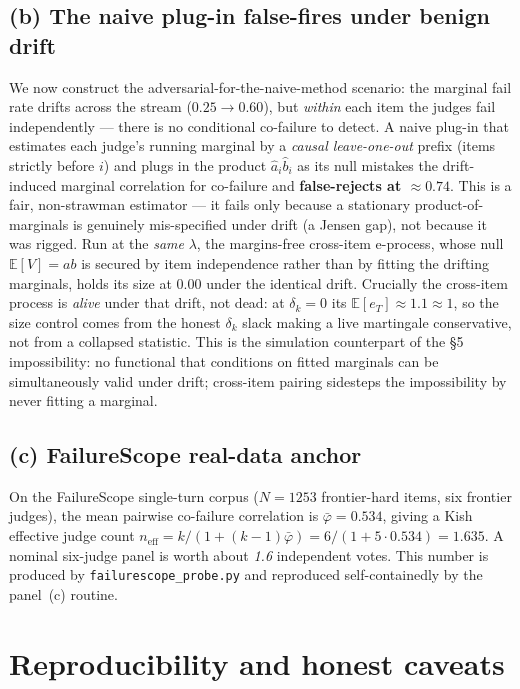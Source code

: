 \documentclass[11pt,a4paper]{article}
\newcommand{\eff}{n_{\mathrm{eff}}}
\begin{document}
\subsection*{(b) The naive plug-in false-fires under benign drift}
We now construct the adversarial-for-the-naive-method scenario: the marginal
fail rate drifts across the stream ($0.25 \to 0.60$), but \emph{within} each
item the judges fail independently --- there is no conditional co-failure to
detect. A naive plug-in that estimates each judge's running marginal by a
\emph{causal leave-one-out} prefix (items strictly before $i$) and plugs in the
product $\hat a_i \hat b_i$ as its null mistakes the drift-induced marginal
correlation for co-failure and \textbf{false-rejects at $\approx 0.74$}. This is
a fair, non-strawman estimator --- it fails only because a stationary
product-of-marginals is genuinely mis-specified under drift (a Jensen gap), not
because it was rigged. Run at the \emph{same} $\lambda$, the margins-free
cross-item e-process, whose null $\mathbb E[V]=ab$ is secured by item
independence rather than by fitting the drifting marginals, holds its size at
\textbf{$0.00$} under the identical drift. Crucially the cross-item process is
\emph{alive} under that drift, not dead: at $\delta_k=0$ its
$\mathbb E[e_T]\approx 1.1 \approx 1$, so the size control comes from the honest
$\delta_k$ slack making a live martingale conservative, not from a collapsed
statistic. This is the simulation counterpart of the \S5 impossibility: no
functional that conditions on fitted marginals can be simultaneously valid under
drift; cross-item pairing sidesteps the impossibility by never fitting a
marginal.

\subsection*{(c) FailureScope real-data anchor}
On the FailureScope single-turn corpus ($N = 1253$ frontier-hard items, six
frontier judges), the mean pairwise co-failure correlation is
$\bar\varphi = 0.534$, giving a Kish effective judge count
$\eff = k / (1 + (k-1)\bar\varphi) = 6/(1 + 5\cdot 0.534) = 1.635$. A nominal
six-judge panel is worth about \emph{1.6} independent votes. This number is
produced by \texttt{failurescope\_probe.py} and reproduced self-containedly by
the panel~(c) routine.

\section{Reproducibility and honest caveats}
\end{document}
